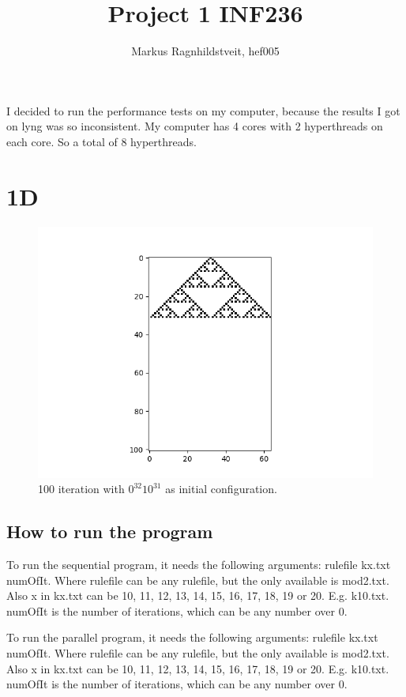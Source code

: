 \documentclass[a4paper]{extarticle}
\title{Project 1 INF236}
\author{Markus Ragnhildstveit, hef005}
\begin{document}
\maketitle

\tableofcontents
\newpage

I decided to run the performance tests on my computer, because the results I got on lyng was so inconsistent. My computer has 4 cores with 2 hyperthreads on each core. So a total of 8 hyperthreads.

\section{1D}
\begin{figure}[!h]
	\center
	\includegraphics[scale=1.0]{Sequential.png}
	\caption{100 iteration with $0^{32}10^{31}$ as initial configuration.}
\end{figure}

\subsection{How to run the program}
To run the sequential program, it needs the following arguments: rulefile kx.txt numOfIt. Where rulefile can be any rulefile, but the only available is mod2.txt. Also x in kx.txt can be 10, 11, 12, 13, 14, 15, 16, 17, 18, 19 or 20. E.g. k10.txt. numOfIt is the number of iterations, which can be any number over 0.

To run the parallel program, it needs the following arguments: rulefile kx.txt numOfIt. Where rulefile can be any rulefile, but the only available is mod2.txt. Also x in kx.txt can be 10, 11, 12, 13, 14, 15, 16, 17, 18, 19 or 20. E.g. k10.txt. numOfIt is the number of iterations, which can be any number over 0.
\end{document}
